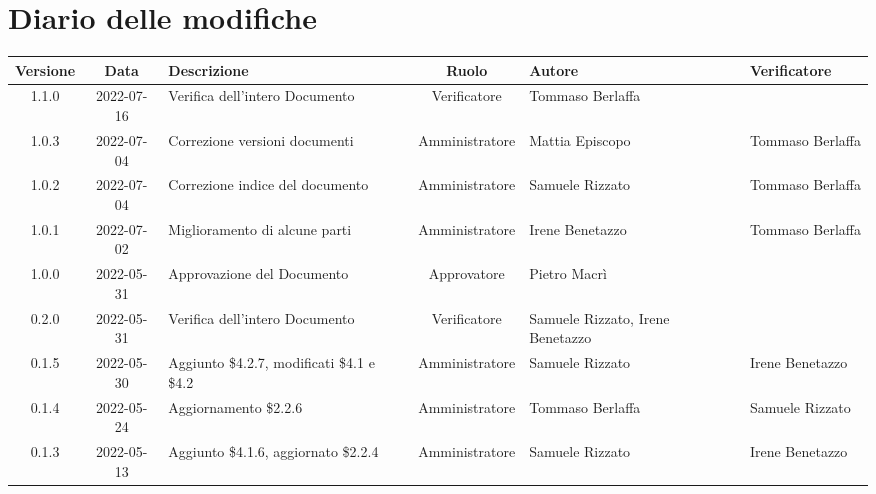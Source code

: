 \section*{Diario delle modifiche}
	\begin{center}
	\renewcommand{\arraystretch}{1.8} %
	\begin{longtable}{ |c|c|p{8em}|c|m{5em}|m{6em}| }
	\hline
	\textbf{Versione} & \textbf{Data} & \textbf{Descrizione} &  \textbf{Ruolo} &  \textbf{Autore} & \textbf{Verificatore}\\ %
	\hline %
  1.1.0 & 2022-07-16 & Verifica dell'intero Documento & Verificatore & Tommaso Berlaffa &  \\
	\hline
	1.0.3 & 2022-07-04 & Correzione versioni documenti & Amministratore & Mattia \newline Episcopo & Tommaso Berlaffa \\
	\hline
	1.0.2 & 2022-07-04 & Correzione indice del documento & Amministratore & Samuele \newline Rizzato & Tommaso Berlaffa \\
	\hline
	1.0.1 & 2022-07-02 & Miglioramento di alcune parti & Amministratore & Irene \newline Benetazzo & Tommaso Berlaffa \\
    \hline
	1.0.0 & 2022-05-31 & Approvazione del Documento & Approvatore & Pietro \newline Macrì & \\
	\hline
	0.2.0 & 2022-05-31 & Verifica dell'intero Documento & Verificatore & Samuele \newline Rizzato, Irene \newline Benetazzo & \\
	\hline
	0.1.5 & 2022-05-30 & Aggiunto \$4.2.7, modificati \$4.1 e \$4.2 & Amministratore & Samuele \newline Rizzato & Irene \newline Benetazzo\\
    \hline
	0.1.4 & 2022-05-24 & Aggiornamento \$2.2.6 & Amministratore & Tommaso \newline Berlaffa & Samuele \newline Rizzato\\
    \hline
    0.1.3 & 2022-05-13 & Aggiunto \$4.1.6, aggiornato \$2.2.4 & Amministratore & Samuele \newline Rizzato & Irene \newline Benetazzo\\

\end{longtable}
\end{center}

